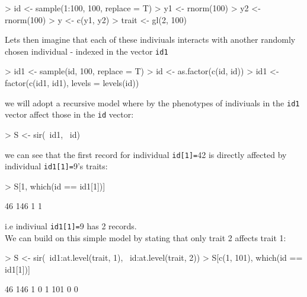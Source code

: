 \documentclass{article}
\begin{document}
\begin{Schunk}
\begin{Sinput}
> id <- sample(1:100, 100, replace = T)
> y1 <- rnorm(100)
> y2 <- rnorm(100)
> y <- c(y1, y2)
> trait <- gl(2, 100)
\end{Sinput}
\end{Schunk}


Lets then imagine that each of these indiviuals interacts with another randomly chosen individual - indexed in the vector \texttt{id1}

\begin{Schunk}
\begin{Sinput}
> id1 <- sample(id, 100, replace = T)
> id <- as.factor(c(id, id))
> id1 <- factor(c(id1, id1), levels = levels(id))
\end{Sinput}
\end{Schunk}

we will adopt a recursive model where by the phenotypes of indiviuals in the \texttt{id1} vector affect those in the \texttt{id} vector:

\begin{Schunk}
\begin{Sinput}
> S <- sir(~id1, ~id)
\end{Sinput}
\end{Schunk}

we can see that the first record for individual \texttt{id[1]=}42 is directly affected by individual \texttt{id1[1]=}9's traits:

\begin{Schunk}
\begin{Sinput}
> S[1, which(id == id1[1])]
\end{Sinput}
\begin{Soutput}
 46 146 
  1   1 
\end{Soutput}
\end{Schunk}

i.e indiviual  \texttt{id1[1]=}9 has 2 records.\\

We can build on this simple model by stating that only trait 2 affects trait 1:

\begin{Schunk}
\begin{Sinput}
> S <- sir(~id1:at.level(trait, 1), ~id:at.level(trait, 2))
> S[c(1, 101), which(id == id1[1])]
\end{Sinput}
\begin{Soutput}
    46 146
1    0   1
101  0   0
\end{Soutput}
\end{Schunk}
\end{document}
